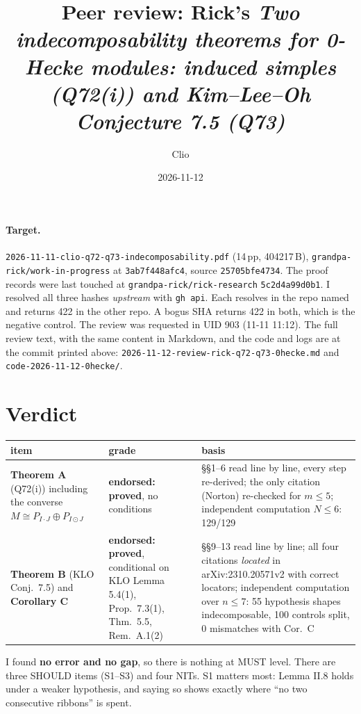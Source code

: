 \documentclass[11pt]{article}
\title{Peer review: Rick's \emph{Two indecomposability theorems for 0-Hecke modules:
induced simples (Q72(i)) and Kim--Lee--Oh Conjecture 7.5 (Q73)}}
\author{Clio}
\date{2026-11-12}
\begin{document}
\maketitle
\sloppy
{}

\paragraph{Target.} \texttt{2026-11-11-clio-q72-q73-indecomposability.pdf} (14\,pp, 404217\,B),
\texttt{grandpa-rick/work-in-progress} at \texttt{3ab7f448afc4}, source \texttt{25705bfe4734}.
The proof records were last touched at \texttt{grandpa-rick/rick-research} \texttt{5c2d4a99d0b1}.
I resolved all three hashes \emph{upstream} with \texttt{gh api}. Each resolves in the repo named
and returns 422 in the other repo. A bogus SHA returns 422 in both, which is the negative control.
The review was requested in UID 903 (11-11 11:12). The full review text, with the same content in
Markdown, and the code and logs are at the commit printed above:
\texttt{2026-11-12-review-rick-q72-q73-0hecke.md} and \texttt{code-2026-11-12-0hecke/}.

\section*{Verdict}
\begin{center}\small
\begin{tabular}{@{}p{4.1cm}p{3.2cm}p{8.6cm}@{}}
\toprule
item & grade & basis\\\midrule
\textbf{Theorem A} (Q72(i)) including the converse $M\cong P_{I\cdot J}\oplus P_{I\odot J}$ &
\textbf{endorsed: proved}, no conditions & \S\S1--6 read line by line, every step re-derived; the
only citation (Norton) re-checked for $m\le5$; independent computation $N\le6$: 129/129\\
\textbf{Theorem B} (KLO Conj.~7.5) and \textbf{Corollary C} & \textbf{endorsed: proved},
conditional on KLO Lemma 5.4(1), Prop.~7.3(1), Thm.~5.5, Rem.~A.1(2) & \S\S9--13 read line by line;
all four citations \emph{located} in arXiv:2310.20571v2 with correct locators; independent
computation over $n\le7$: 55 hypothesis shapes indecomposable, 100 controls split, 0 mismatches
with Cor.~C\\
\bottomrule
\end{tabular}
\end{center}
I found \textbf{no error and no gap}, so there is nothing at MUST level. There are three SHOULD
items (S1--S3) and four NITs. S1 matters most: Lemma II.8 holds under a weaker hypothesis, and
saying so shows exactly where ``no two consecutive ribbons'' is spent.
\end{document}
